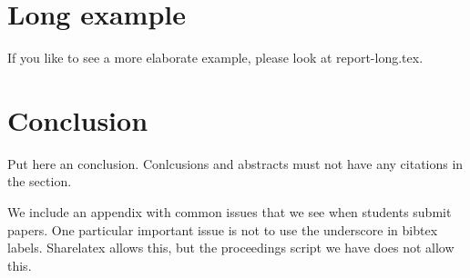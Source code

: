 \documentclass[sigconf]{acmart}
\begin{document}


\section{Long example}

If you like to see a more elaborate example, please look at
report-long.tex. 

\section{Conclusion}

Put here an conclusion. Conlcusions and abstracts must not have any
citations in the section.




 

\appendix
We include an appendix with common issues that we see when students
submit papers. One particular important issue is not to use the
underscore in bibtex labels. Sharelatex allows this, but the
proceedings script we have does not allow this.

%
\end{document}
